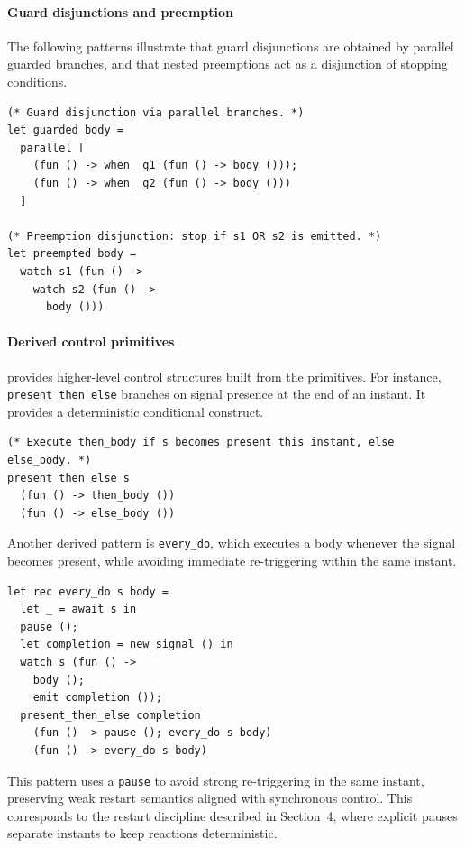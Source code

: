 \paragraph{Guard disjunctions and preemption}
The following patterns illustrate that guard disjunctions are obtained by
parallel guarded branches, and that nested preemptions act as a disjunction of
stopping conditions.
\begin{lstlisting}[style=tempo]
(* Guard disjunction via parallel branches. *)
let guarded body =
  parallel [
    (fun () -> when_ g1 (fun () -> body ()));
    (fun () -> when_ g2 (fun () -> body ()))
  ]

(* Preemption disjunction: stop if s1 OR s2 is emitted. *)
let preempted body =
  watch s1 (fun () ->
    watch s2 (fun () ->
      body ()))
\end{lstlisting}

\paragraph{Derived control primitives}
\tempo{} provides higher-level control structures built from the primitives.
For instance, \linebreak \texttt{present\_then\_else} branches on signal
presence at the end of an instant. It provides a deterministic conditional
construct.
\begin{lstlisting}[style=tempo]
(* Execute then_body if s becomes present this instant, else else_body. *)
present_then_else s
  (fun () -> then_body ())
  (fun () -> else_body ())
\end{lstlisting}

Another derived pattern is \texttt{every\_do}, which executes a body whenever
the signal becomes present, while avoiding immediate re-triggering within the
same instant.
\begin{lstlisting}[style=tempo]
let rec every_do s body =
  let _ = await s in
  pause ();
  let completion = new_signal () in
  watch s (fun () ->
    body ();
    emit completion ());
  present_then_else completion
    (fun () -> pause (); every_do s body)
    (fun () -> every_do s body)
\end{lstlisting}
This pattern uses a \texttt{pause} to avoid strong re-triggering in the same
instant, preserving weak restart semantics aligned with synchronous control.
This corresponds to the restart discipline described in Section~4, where
explicit pauses separate instants to keep reactions deterministic.

